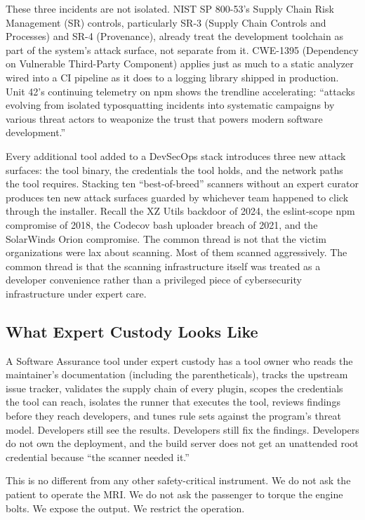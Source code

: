 These three incidents are not isolated. NIST SP 800-53's Supply Chain Risk Management (SR) controls, particularly SR-3 (Supply Chain Controls and Processes) and SR-4 (Provenance), already treat the development toolchain as part of the system's attack surface, not separate from it.\autocite{20260525:nist80053rev5} CWE-1395 (Dependency on Vulnerable Third-Party Component) applies just as much to a static analyzer wired into a CI pipeline as it does to a logging library shipped in production.\autocite{20260525:cwe1395} Unit 42's continuing telemetry on npm shows the trendline accelerating: ``attacks evolving from isolated typosquatting incidents into systematic campaigns by various threat actors to weaponize the trust that powers modern software development.''\autocite{20260525:unit42}

Every additional tool added to a DevSecOps stack introduces three new attack surfaces: the tool binary, the credentials the tool holds, and the network paths the tool requires. Stacking ten ``best-of-breed'' scanners without an expert curator produces ten new attack surfaces guarded by whichever team happened to click through the installer. Recall the XZ Utils backdoor of 2024, the eslint-scope npm compromise of 2018, the Codecov bash uploader breach of 2021, and the SolarWinds Orion compromise. The common thread is not that the victim organizations were lax about scanning. Most of them scanned aggressively. The common thread is that the scanning infrastructure itself was treated as a developer convenience rather than a privileged piece of cybersecurity infrastructure under expert care.

\subsection*{What Expert Custody Looks Like}

A Software Assurance tool under expert custody has a tool owner who reads the maintainer's documentation (including the parentheticals), tracks the upstream issue tracker, validates the supply chain of every plugin, scopes the credentials the tool can reach, isolates the runner that executes the tool, reviews findings before they reach developers, and tunes rule sets against the program's threat model. Developers still see the results. Developers still fix the findings. Developers do not own the deployment, and the build server does not get an unattended root credential because ``the scanner needed it.''

This is no different from any other safety-critical instrument. We do not ask the patient to operate the MRI. We do not ask the passenger to torque the engine bolts. We expose the output. We restrict the operation.

